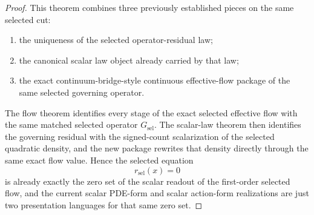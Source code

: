 \begin{proof}
This theorem combines three previously established pieces on the same selected
cut:
\begin{enumerate}
\item the uniqueness of the selected operator-residual law;
\item the canonical scalar law object already carried by that law;
\item the exact continuum-bridge-style continuous effective-flow package of the same
      selected governing operator.
\end{enumerate}

The flow theorem identifies every stage of the exact selected effective flow
with the same matched selected operator \(G_{\mathrm{sel}}\). The scalar-law
theorem then identifies the governing residual with the signed-count
scalarization of the selected quadratic density, and the new package rewrites
that density directly through the same exact flow value. Hence the selected
equation
\[
r_{\mathrm{sel}}(x)=0
\]
is already exactly the zero set of the scalar readout of the first-order
selected flow, and the current scalar PDE-form and scalar action-form
realizations are just two presentation languages for that same zero set.
\end{proof}

